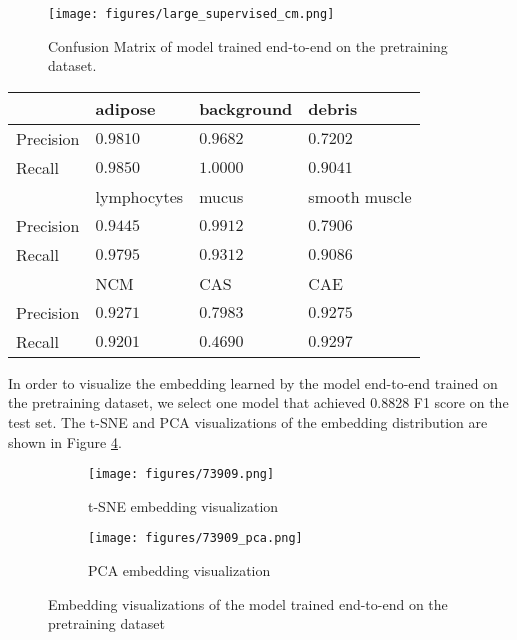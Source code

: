 \documentclass[12pt,twoside]{report}
\begin{document}

\begin{figure}
    \centering
    \texttt{[image: figures/large\_supervised\_cm.png]}
    \caption{Confusion Matrix of model trained end-to-end on the pretraining dataset.}
    \label{fig:large_supervised_cm}
\end{figure}

\begin{table}[]
    \centering
    \begin{tabular}{llll}
\toprule
 & adipose & background & debris \\
\hline
Precision & $0.9810$ & $0.9682$ & $0.7202$ \\
Recall & $0.9850$ & $1.0000$ & $0.9041$ \\
\toprule
 & lymphocytes & mucus & smooth muscle \\
\hline
Precision & $0.9445$ & $0.9912$ & $0.7906$ \\
Recall & $0.9795$ & $0.9312$ & $0.9086$ \\
\toprule
 & NCM & CAS & CAE \\
\hline
Precision & $0.9271$ & $0.7983$ & $0.9275$ \\
Recall & $0.9201$ & $0.4690$ & $0.9297$ \\
    \bottomrule
    \end{tabular}
    \captionsetup{type=table}
    \label{tab:large_supervised_preci_recall}
\end{table}



In order to visualize the embedding learned by the model end-to-end trained on the pretraining dataset, we select one model that achieved 0.8828 F1 score on the test set. The t-SNE and PCA visualizations of the embedding distribution are shown in Figure \ref{fig:large_supervised_embedding}. \\


\begin{figure}
\centering
    \begin{subfigure}{.45\textwidth}
      \centering
      \texttt{[image: figures/73909.png]}
      \caption{t-SNE embedding visualization}
      \label{fig:large_supervised_tsne}
    \end{subfigure}%
    \begin{subfigure}{.45\textwidth}
      \centering
      \texttt{[image: figures/73909\_pca.png]}
      \caption{PCA embedding visualization}
      \label{fig:large_supervised_pca}
    \end{subfigure}
    \caption{Embedding visualizations of the model trained end-to-end on the pretraining dataset}
    \label{fig:large_supervised_embedding}
\end{figure}
\end{document}
